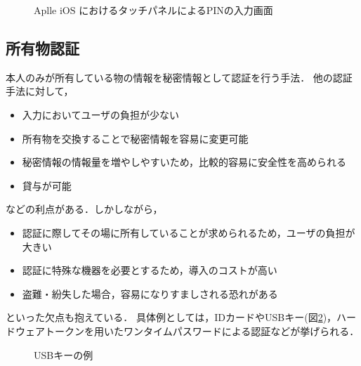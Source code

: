 \begin{figure}[th]
\begin{center}
\end{center}
\caption{Aplle iOS におけるタッチパネルによるPINの入力画面}
\label{fig:iosPIN}
\end{figure}

\subsection{所有物認証}\label{subsec:possession}
本人のみが所有している物の情報を秘密情報として認証を行う手法．
他の認証手法に対して，
\begin{itemize}
\item 入力においてユーザの負担が少ない
\item 所有物を交換することで秘密情報を容易に変更可能
\item 秘密情報の情報量を増やしやすいため，比較的容易に安全性を高められる
\item 貸与が可能
\end{itemize}
などの利点がある．しかしながら，
\begin{itemize}
\item 認証に際してその場に所有していることが求められるため，ユーザの負担が大きい
\item 認証に特殊な機器を必要とするため，導入のコストが高い
\item 盗難・紛失した場合，容易になりすましされる恐れがある
\end{itemize}
といった欠点も抱えている．
具体例としては，IDカードやUSBキー(図\ref{fig:dongle})，ハードウェアトークンを用いたワンタイムパスワードによる認証などが挙げられる．

\begin{figure}[th]
\begin{center}
\end{center}
\caption{USBキーの例}
\label{fig:dongle}
\end{figure}


